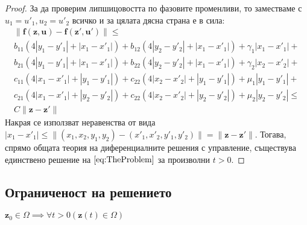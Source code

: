 \begin{proof}
  За да проверим липшицовостта по фазовите променливи, то заместваме с $u_1 = u'_1, u_2 = u'_2$ всичко и за цялата дясна страна е в сила:
  \begin{multline}
    \|\mathbf{f}(\mathbf{z}, \mathbf{u}) - \mathbf{f}(\mathbf{z}', \mathbf{u}')\| \leq \\
    b_{11} (4 |y_1 - y'_1| + |x_1 - x'_1|) +
    b_{12} (4 |y_2 - y'_2| + |x_1 - x'_1|) + \gamma_1 |x_1-x'_1| + \\
    b_{21} (4 |y_1 - y'_1| + |x_1 - x'_1|) +
    b_{22} (4 |y_2 - y'_2| + |x_1 - x'_1|) + \gamma_2 |x_2-x'_2| + \\
    c_{11} (4 |x_1 - x'_1| + |y_1 - y'_1|) +
    c_{22} (4 |x_2 - x'_2| + |y_1 - y'_1|) + \mu_1 |y_1 - y'_1| + \\
    c_{21} (4 |x_1 - x'_1| + |y_2 - y'_2|) +
    c_{22} (4 |x_2 - x'_2| + |y_2 - y'_2|) + \mu_2 |y_2 - y'_2| \leq \\
    C \|\mathbf{z} - \mathbf{z}'\|
  \end{multline}
  Накрая се използват неравенства от вида $|x_1-x'_1| \leq \|(x_1, x_2, y_1, y_2) - (x'_1, x'_2, y'_1, y'_2)\| = \|\mathbf{z} - \mathbf{z}'\|$.
  Тогава, спрямо общата теория на диференциалните решения с управление, съществува единствено решение на $\eqref{eq:TheProblem}$ за произволни $t>0$.
  \end{proof}

\subsection{Ограниченост на решението}

\begin{proposition}
  $\mathbf{z}_0 \in \Omega \implies \forall{t>0}\left(\mathbf{z}(t) \in \Omega\right)$
\end{proposition}

